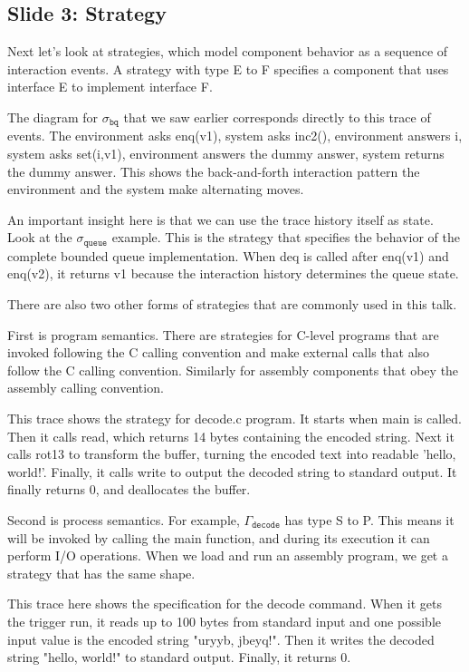 \documentclass{article}
\newcommand{\kw}[1]{\ensuremath{\mathtt{#1}}}
\begin{document}
\subsection{Slide 3: Strategy}

Next let's look at strategies, which model component behavior as a sequence of
interaction events. A strategy with type E to F specifies a component that uses
interface E to implement interface F.

The diagram for $\sigma_\kw{bq}$ that we saw earlier corresponds directly to
this trace of events. The environment asks enq(v1), system asks inc2(),
environment answers i, system asks set(i,v1), environment answers the dummy
answer, system returns the dummy answer. This shows the back-and-forth
interaction pattern the environment and the system make alternating moves.

An important insight here is that we can use the trace history itself as state.
Look at the $\sigma_\kw{queue}$ example. This is the strategy that specifies the
behavior of the complete bounded queue implementation. When deq is called after
enq(v1) and enq(v2), it returns v1 because the interaction history determines
the queue state.

There are also two other forms of strategies that are commonly used in this talk.

First is program semantics. There are strategies for C-level programs that are
invoked following the C calling convention and make external calls that also
follow the C calling convention. Similarly for assembly components that obey the
assembly calling convention.

This trace shows the strategy for decode.c program. It starts when main is
called. Then it calls read, which returns 14 bytes containing the encoded
string. Next it calls rot13 to transform the buffer, turning the encoded text
into readable 'hello, world!'. Finally, it calls write to output the
decoded string to standard output. It finally returns 0, and deallocates the buffer.

Second is process semantics. For example, $\Gamma_\kw{decode}$ has type S
to P. This means it will be invoked by calling the main function, and during its
execution it can perform I/O operations. When we load and run an assembly
program, we get a strategy that has the same shape.

This trace here shows the specification for the decode command. When it gets the
trigger run, it reads up to 100 bytes from standard input and
one possible input value is the encoded string "uryyb, jbeyq!".
Then it writes the decoded string "hello, world!" to standard output.
Finally, it returns 0.
\end{document}
